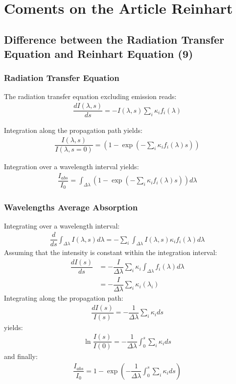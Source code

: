 \section{Coments on the Article Reinhart}

\subsection{Difference between the Radiation Transfer Equation and Reinhart Equation (9)}

\subsubsection{Radiation Transfer Equation}
The radiation transfer equation excluding emission reads:
\begin{align}
	\label{eqn:120}
	\dfrac{d I(\lambda, s)}{ds} = - I(\lambda, s) \sum_i \kappa_i f_i(\lambda)
\end{align}

Integration along the propagation path yields:
\begin{align}
	\dfrac{I(\lambda,s)}{I(\lambda, s = 0)} = \left(1 - \exp\left(-\sum_i \kappa_i f_i(\lambda) s\right)\right)
\end{align}

Integration over a wavelength interval yields:
\begin{align}
	\label{eqn:122}
	\dfrac{I_{abs}}{I_0} = \int_{\Delta \lambda} \left(1 - \exp\left(-\sum_i \kappa_i f_i(\lambda) s\right)\right) d \lambda
\end{align}

\subsubsection{Wavelengths Average Absorption}

Integrating  over a wavelength interval:
\begin{align}
	\dfrac{d}{ds} \int_{\Delta \lambda} I(\lambda, s) d \lambda = - \sum_i  \int_{\Delta \lambda} I(\lambda, s) \kappa_i f_i(\lambda)  d \lambda
\end{align}
Assuming that the intensity is constant within the integration interval:
\begin{align}
    \dfrac{d I(s)}{ds} &= - \dfrac{I}{\Delta \lambda} \sum_i \kappa_i  \int_{\Delta \lambda}  f_i(\lambda)  d \lambda \\
                    &= - \dfrac{I}{\Delta \lambda} \sum_i \kappa_i(\lambda_i)
\end{align}
Integrating along the propagation path:
\begin{align}
	\dfrac{dI(s)}{I(s)} = - \dfrac{1}{\Delta \lambda} \sum_i \kappa_i ds
\end{align}
yields:
\begin{align}
	\ln \dfrac{I(s)}{I(0)} = - \dfrac{1}{\Delta \lambda} \int_{0}^{s} \sum_i \kappa_i ds
\end{align}
and finally:
\begin{align}
	\label{eqn:128}
	\dfrac{I_{abs}}{I_0} = 1 - \exp\left( - \dfrac{1}{\Delta \lambda} \int_{0}^{s} \sum_i \kappa_i ds \right)
\end{align}

